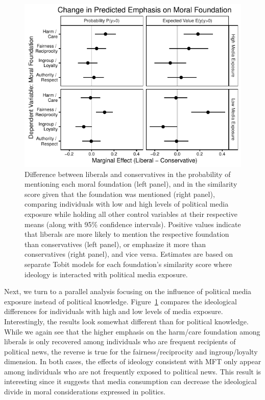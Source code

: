 \documentclass[12pt]{article}
\begin{document}
\begin{figure}[ht]\centering
\includegraphics{../calc/fig/tobit_ideol_media.pdf}
\caption{Difference between liberals and conservatives in the probability of mentioning each moral foundation (left panel), and in the similarity score given that the foundation was mentioned (right panel), comparing individuals with low and high levels of political media exposure while holding all other control variables at their respective means (along with 95\% confidence intervals). Positive values indicate that liberals are more likely to mention the respective foundation than conservatives (left panel), or emphasize it more than conservatives (right panel), and vice versa. Estimates are based on separate Tobit models for each foundation's similarity score where ideology is interacted with political media exposure.}\label{fig:tobit_ideol_media}
\end{figure}

Next, we turn to a parallel analysis focusing on the influence of political media exposure instead of political knowledge. Figure~\ref{fig:tobit_ideol_media} compares the ideological differences for individuals with high and low levels of media exposure. Interestingly, the results look somewhat different than for political knowledge. While we again see that the higher emphasis on the harm/care foundation among liberals is only recovered among individuals who are frequent recipients of political news, the reverse is true for the fairness/reciprocity and ingroup/loyalty dimension. In both cases, the effects of ideology consistent with MFT only appear among individuals who are not frequently exposed to political news. This result is interesting since it suggests that media consumption can decrease the ideological divide in moral considerations expressed in politics.
\end{document}
